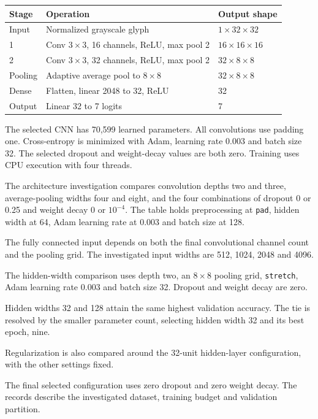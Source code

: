 \begin{center}\begin{tabularx}{\linewidth}{@{}lXl@{}}\toprule
Stage & Operation & Output shape\\\midrule
Input & Normalized grayscale glyph & $1\times32\times32$\\
1 & Conv $3\times3$, 16 channels, ReLU, max pool 2 & $16\times16\times16$\\
2 & Conv $3\times3$, 32 channels, ReLU, max pool 2 & $32\times8\times8$\\
Pooling & Adaptive average pool to $8\times8$ & $32\times8\times8$\\
Dense & Flatten, linear 2048 to 32, ReLU & 32\\
Output & Linear 32 to 7 logits & 7\\\bottomrule
\end{tabularx}\end{center}
The selected CNN has 70,599 learned parameters. All convolutions use padding one. Cross-entropy is minimized with Adam, learning rate 0.003 and batch size 32. The selected dropout and weight-decay values are both zero. Training uses CPU execution with four threads.

The architecture investigation compares convolution depths two and three, average-pooling widths four and eight, and the four combinations of dropout 0 or 0.25 and weight decay 0 or $10^{-4}$. The table holds preprocessing at \texttt{pad}, hidden width at 64, Adam learning rate at 0.003 and batch size at 128.

The fully connected input depends on both the final convolutional channel count and the pooling grid. The investigated input widths are 512, 1024, 2048 and 4096.

The hidden-width comparison uses depth two, an $8\times8$ pooling grid, \texttt{stretch}, Adam learning rate 0.003 and batch size 32. Dropout and weight decay are zero.

Hidden widths 32 and 128 attain the same highest validation accuracy. The tie is resolved by the smaller parameter count, selecting hidden width 32 and its best epoch, nine.

Regularization is also compared around the 32-unit hidden-layer configuration, with the other settings fixed.

The final selected configuration uses zero dropout and zero weight decay. The records describe the investigated dataset, training budget and validation partition.

